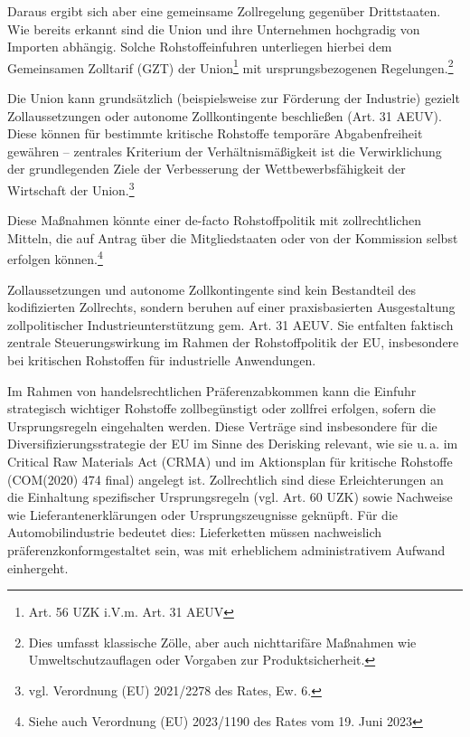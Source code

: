 \documentclass[12pt,a4paper,oneside]{book} %
\begin{document}
Daraus ergibt sich aber eine gemeinsame Zollregelung gegenüber Drittstaaten. Wie bereits erkannt sind die Union und ihre Unternehmen hochgradig von Importen abhängig. Solche Rohstoffeinfuhren unterliegen hierbei dem Gemeinsamen Zolltarif (GZT) der Union\footnote{Art. 56 UZK i.V.m. Art. 31 AEUV} mit ursprungsbezogenen Regelungen.\footnote{Dies umfasst klassische Zölle, aber auch nichttarifäre Maßnahmen wie Umweltschutzauflagen oder Vorgaben zur Produktsicherheit.}

Die Union kann grundsätzlich (beispielsweise zur Förderung der Industrie) gezielt Zollaussetzungen oder autonome Zollkontingente beschließen (Art. 31 AEUV). Diese können für bestimmte kritische Rohstoffe temporäre Abgabenfreiheit gewähren -- zentrales Kriterium der Verhältnismäßigkeit ist die Verwirklichung der grundlegenden Ziele der Verbesserung der Wettbewerbsfähigkeit der Wirtschaft der Union.\footnote{vgl. Verordnung (EU) 2021/2278 des Rates, Ew. 6.}

Diese Maßnahmen könnte einer de-facto Rohstoffpolitik mit zollrechtlichen Mitteln, die auf Antrag über die Mitgliedstaaten oder von der Kommission selbst erfolgen können.\footnote{Siehe auch Verordnung (EU) 2023/1190 des Rates vom 19. Juni 2023}

Zollaussetzungen und autonome Zollkontingente sind kein Bestandteil des kodifizierten Zollrechts, sondern beruhen auf einer praxisbasierten Ausgestaltung zollpolitischer Industrieunterstützung gem. Art. 31 AEUV. Sie entfalten faktisch zentrale Steuerungswirkung im Rahmen der Rohstoffpolitik der EU, insbesondere bei kritischen Rohstoffen für industrielle Anwendungen.


Im Rahmen von handelsrechtlichen Präferenzabkommen kann die Einfuhr strategisch wichtiger Rohstoffe zollbegünstigt oder zollfrei erfolgen, sofern die Ursprungsregeln eingehalten werden. Diese Verträge sind insbesondere für die Diversifizierungsstrategie der EU im Sinne des Derisking relevant, wie sie u. a. im Critical Raw Materials Act (CRMA) und im Aktionsplan für kritische Rohstoffe (COM(2020) 474 final) angelegt ist. Zollrechtlich sind diese Erleichterungen an die Einhaltung spezifischer Ursprungsregeln (vgl. Art. 60 UZK) sowie Nachweise wie Lieferantenerklärungen oder Ursprungszeugnisse geknüpft. Für die Automobilindustrie bedeutet dies: Lieferketten müssen nachweislich \glqq präferenzkonform\grqq gestaltet sein, was mit erheblichem administrativem Aufwand einhergeht.
\end{document}
